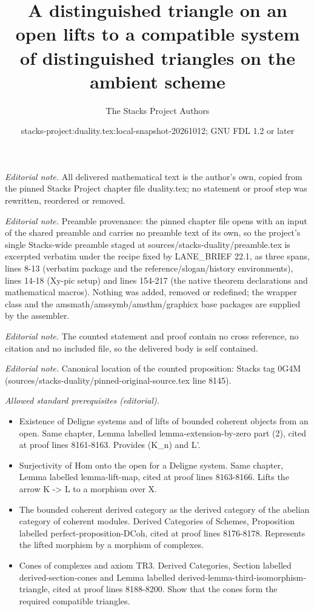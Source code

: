 \documentclass[10pt,a4paper]{amsart}
\title{A distinguished triangle on an open lifts to a compatible system of distinguished triangles on the ambient scheme}
\author{The Stacks Project Authors}
\date{stacks-project:duality.tex:local-snapshot-20261012; GNU FDL 1.2 or later}
\theoremstyle{plain}
\theoremstyle{definition}
\theoremstyle{remark}
\numberwithin{equation}{subsection}
\begin{document}
\maketitle
\noindent\textit{Editorial note.} All delivered mathematical text is the author's own, copied from the pinned Stacks Project chapter file duality.tex; no statement or proof step was rewritten, reordered or removed.\par\medskip
\noindent\textit{Editorial note.} Preamble provenance: the pinned chapter file opens with an input of the shared preamble and carries no preamble text of its own, so the project's single Stacks-wide preamble staged at sources/stacks-duality/preamble.tex is excerpted verbatim under the recipe fixed by LANE\_BRIEF 22.1, as three spans, lines 8-13 (verbatim package and the reference/slogan/history environments), lines 14-18 (Xy-pic setup) and lines 154-217 (the native theorem declarations and mathematical macros). Nothing was added, removed or redefined; the wrapper class and the amsmath/amssymb/amsthm/graphicx base packages are supplied by the assembler.\par\medskip
\noindent\textit{Editorial note.} The counted statement and proof contain no cross reference, no citation and no included file, so the delivered body is self contained.\par\medskip
\noindent\textit{Editorial note.} Canonical location of the counted proposition: Stacks tag 0G4M (sources/stacks-duality/pinned-original-source.tex line 8145).\par\medskip
\noindent\textit{Allowed standard prerequisites (editorial).}\begin{itemize}
\item Existence of Deligne systems and of lifts of bounded coherent objects from an open. Same chapter, Lemma labelled lemma-extension-by-zero part (2), cited at proof lines 8161-8163. Provides (K\_n) and L'.
\item Surjectivity of Hom onto the open for a Deligne system. Same chapter, Lemma labelled lemma-lift-map, cited at proof lines 8163-8166. Lifts the arrow K -> L to a morphism over X.
\item The bounded coherent derived category as the derived category of the abelian category of coherent modules. Derived Categories of Schemes, Proposition labelled perfect-proposition-DCoh, cited at proof lines 8176-8178. Represents the lifted morphism by a morphism of complexes.
\item Cones of complexes and axiom TR3. Derived Categories, Section labelled derived-section-cones and Lemma labelled derived-lemma-third-isomorphism-triangle, cited at proof lines 8188-8200. Show that the cones form the required compatible triangles.
\end{itemize}\medskip
\end{document}
